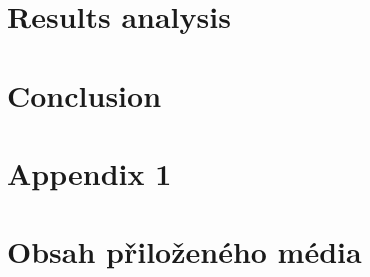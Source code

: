\documentclass[english,master,unicode]{ctufit-thesis}
\theoremstyle{plain}
\theoremstyle{definition}
\theoremstyle{remark}
\numberwithin{theorem}{chapter}
\begin{document}
\chapter{Results analysis}

\chapter{Conclusion}


\appendix\appendixinit
\chapter{Appendix 1}


\backmatter
\printbibliography


\chapter{Obsah přiloženého média}
\end{document}
